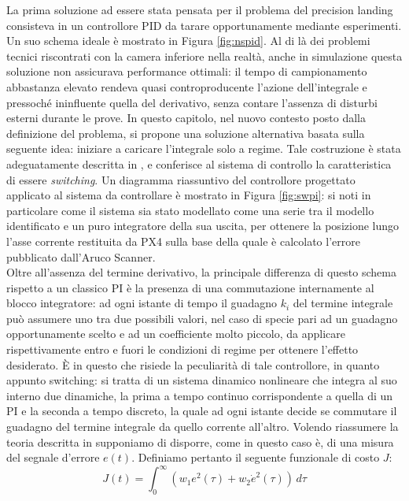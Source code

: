 \indent La prima soluzione ad essere stata pensata per il problema del precision landing consisteva in un controllore PID da tarare opportunamente mediante esperimenti. Un suo schema ideale è mostrato in Figura \ref{fig:nspid}. Al di là dei problemi tecnici riscontrati con la camera inferiore nella realtà, anche in simulazione questa soluzione non assicurava performance ottimali: il tempo di campionamento abbastanza elevato rendeva quasi controproducente l'azione dell'integrale e pressoché ininfluente quella del derivativo, senza contare l'assenza di disturbi esterni durante le prove. In questo capitolo, nel nuovo contesto posto dalla definizione del problema, si propone una soluzione alternativa basata sulla seguente idea: iniziare a caricare l'integrale solo a regime. Tale costruzione è stata adeguatamente descritta in \cite{pisw}, e conferisce al sistema di controllo la caratteristica di essere \emph{switching}. Un diagramma riassuntivo del controllore progettato applicato al sistema da controllare è mostrato in Figura \ref{fig:swpi}: si noti in particolare come il sistema sia stato modellato come una serie tra il modello identificato e un puro integratore della sua uscita, per ottenere la posizione lungo l'asse corrente restituita da PX4 sulla base della quale è calcolato l'errore pubblicato dall'Aruco Scanner.\\
Oltre all'assenza del termine derivativo, la principale differenza di questo schema rispetto a un classico PI è la presenza di una commutazione internamente al blocco integratore: ad ogni istante di tempo il guadagno $k_i$ del termine integrale può assumere uno tra due possibili valori, nel caso di specie pari ad un guadagno opportunamente scelto e ad un coefficiente molto piccolo, da applicare rispettivamente entro e fuori le condizioni di regime per ottenere l'effetto desiderato. È in questo che risiede la peculiarità di tale controllore, in quanto appunto switching: si tratta di un sistema dinamico nonlineare che integra al suo interno due dinamiche, la prima a tempo continuo corrispondente a quella di un PI e la seconda a tempo discreto, la quale ad ogni istante decide se commutare il guadagno del termine integrale da quello corrente all'altro. Volendo riassumere la teoria descritta in \cite{pisw} supponiamo di disporre, come in questo caso è, di una misura del segnale d'errore $e(t)$. Definiamo pertanto il seguente funzionale di costo $J$:
\begin{equation}
    J(t) = \int_{0}^{\infty} (w_1e^2(\tau) + w_2\dot{e}^2(\tau)) \,d\tau
\end{equation}
